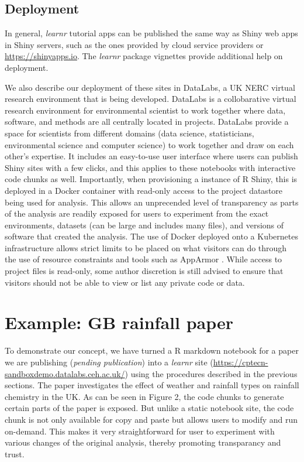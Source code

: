 \hypertarget{deployment}{%
\subsection{Deployment}\label{deployment}}

In general, \emph{learnr} tutorial apps can be published the same way as
Shiny web apps in Shiny servers, such as the ones provided by cloud
service providers or \url{https://shinyapps.io}. The \emph{learnr}
package vignettes provide additional help on deployment.

We also describe our deployment of these sites in DataLabs, a UK NERC
virtual research environment that is being developed. DataLabs is a
collobarative virtual research environment \citep{Hollaway2020} for
environmental scientist to work together where data, software, and
methods are all centrally located in projects. DataLabs provide a space
for scientists from different domains (data science, statisticians,
environmental science and computer science) to work together and draw on
each other's expertise. It includes an easy-to-use user interface where
users can publish Shiny sites with a few clicks, and this applies to
these notebooks with interactive code chunks as well. Importantly, when
provisioning a instance of R Shiny, this is deployed in a Docker
container with read-only access to the project datastore being used for
analysis. This allows an unprecended level of transparency as parts of
the analysis are readily exposed for users to experiment from the exact
environments, datasets (can be large and includes many files), and
versions of software that created the analysis. The use of Docker
deployed onto a Kubernetes infrastructure allows strict limits to be
placed on what visitors can do through the use of resource constraints
and tools such as AppArmor \citep{RAppArmor}. While access to project
files is read-only, some author discretion is still advised to ensure
that visitors should not be able to view or list any private code or
data.

\hypertarget{example-gb-rainfall-paper}{%
\section{Example: GB rainfall
paper}\label{example-gb-rainfall-paper}}

To demonstrate our concept, we have turned a R markdown notebook for a
paper we are publishing (\emph{pending publication}) into a
\emph{learnr} site
(\url{https://cptecn-sandboxdemo.datalabs.ceh.ac.uk/}) using the
procedures described in the previous sections. The paper investigates
the effect of weather and rainfall types on rainfall chemistry in the
UK. As can be seen in Figure 2, the code chunks to generate certain
parts of the paper is exposed. But unlike a static notebook site, the
code chunk is not only available for copy and paste but allows users to
modify and run on-demand. This makes it very straightforward for user to
experiment with various changes of the original analysis, thereby
promoting transparancy and trust.

